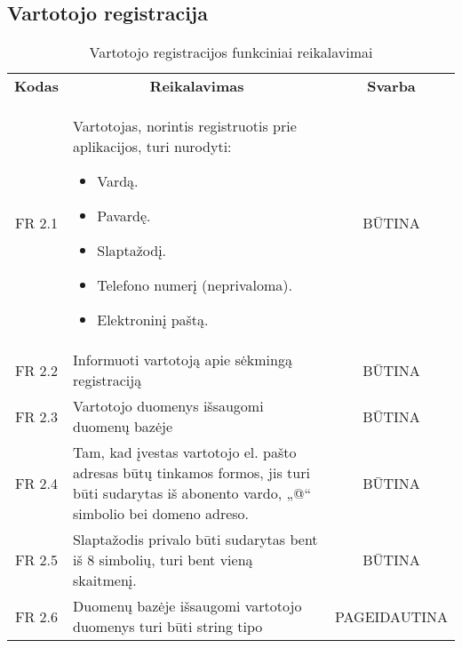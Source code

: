 \documentclass{VUMIFPSkursinis}
\begin{document}
\subsection{Vartotojo registracija}
\begin{center}

	\begin{table}[H]
	\begin{tabular}{|p{2cm}|p{}|p{}|}
	\hline
	    \rowcolor{lightgray}
		\multicolumn{3}{|c|}{Vartotojo registracija}\\
		
	\hline
		\multicolumn{1}{|c|}{{\bfseries Kodas}}&
		\multicolumn{1}{|c|}{{\bfseries Reikalavimas}}&
		\multicolumn{1}{|c|}{{\bfseries Svarba}}\\

	\hline
	\multicolumn{1}{|c|}{FR 2.1}&
	{Vartotojas, norintis registruotis prie aplikacijos, turi nurodyti:
		\begin{itemize}
			\item Vardą.
			\item Pavardę.
			\item Slaptažodį.
			\item Telefono numerį (neprivaloma).
			\item Elektroninį paštą.
		\end{itemize}}&		
	\multicolumn{1}{|c|}{BŪTINA}\\
	\hline
	
		\multicolumn{1}{|c|}{FR 2.2}&
		{Informuoti vartotoją apie sėkmingą registraciją}&
		\multicolumn{1}{|c|}{BŪTINA}\\	
	\hline
		\multicolumn{1}{|c|}{FR 2.3}&
		{Vartotojo duomenys išsaugomi duomenų bazėje}&
		\multicolumn{1}{|c|}{BŪTINA}\\	
	\hline	
		\multicolumn{1}{|c|}{FR 2.4}&
		{Tam, kad įvestas vartotojo el. pašto adresas būtų tinkamos formos, jis turi būti sudarytas iš abonento vardo, „@“ simbolio bei domeno adreso.}&
		\multicolumn{1}{|c|}{BŪTINA}\\	
	\hline
		\multicolumn{1}{|c|}{FR 2.5}&
		{Slaptažodis privalo būti sudarytas bent iš 8 simbolių, turi bent vieną skaitmenį.
}&
		\multicolumn{1}{|c|}{BŪTINA}\\		
	\hline
		\multicolumn{1}{|c|}{FR 2.6}&
		{Duomenų bazėje išsaugomi vartotojo duomenys turi būti string tipo }&
		\multicolumn{1}{|p{1.5cm}|}{PAGEIDAUTINA}\\		
	\hline
	
	\end{tabular}
	\caption{Vartotojo registracijos funkciniai reikalavimai}
	\label{table:VartotojoRegistracija}
	\end{table}

\end{center}
\end{document}
